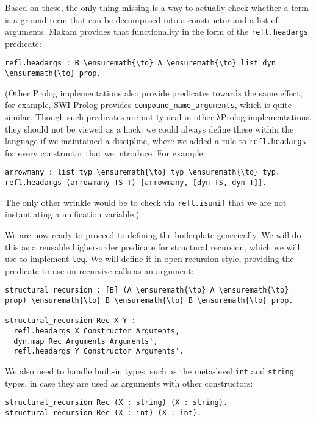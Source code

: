 Based on these, the only thing missing is a way to actually check
whether a term is a ground term that can be decomposed into a
constructor and a list of arguments. Makam provides that functionality
in the form of the \texttt{refl.headargs} predicate:

\begin{verbatim}
refl.headargs : B \ensuremath{\to} A \ensuremath{\to} list dyn \ensuremath{\to} prop.
\end{verbatim}

(Other Prolog implementations also provide predicates towards the same
effect; for example, SWI-Prolog provides
\texttt{compound\_name\_arguments}, which is quite similar. Though such
predicates are not typical in other \foreignlanguage{greek}{λ}Prolog implementations, they should
not be viewed as a hack: we could always define these within the
language if we maintained a discipline, where we added a rule to
\texttt{refl.headargs} for every constructor that we introduce. For
example:

\begin{verbatim}
arrowmany : list typ \ensuremath{\to} typ \ensuremath{\to} typ.
refl.headargs (arrowmany TS T) [arrowmany, [dyn TS, dyn T]].
\end{verbatim}

The only other wrinkle would be to check via \texttt{refl.isunif} that
we are not instantiating a unification variable.)

We are now ready to proceed to defining the boilerplate generically. We
will do this as a reusable higher-order predicate for structural
recursion, which we will use to implement \texttt{teq}. We will define
it in open-recursion style, providing the predicate to use on recursive
calls as an argument:

\begin{verbatim}
structural_recursion : [B] (A \ensuremath{\to} A \ensuremath{\to} prop) \ensuremath{\to} B \ensuremath{\to} B \ensuremath{\to} prop.

structural_recursion Rec X Y :-
  refl.headargs X Constructor Arguments,
  dyn.map Rec Arguments Arguments',
  refl.headargs Y Constructor Arguments'.
\end{verbatim}

We also need to handle built-in types, such as the meta-level
\texttt{int} and \texttt{string} types, in case they are used as
arguments with other constructors:

\begin{verbatim}
structural_recursion Rec (X : string) (X : string).
structural_recursion Rec (X : int) (X : int).
\end{verbatim}

